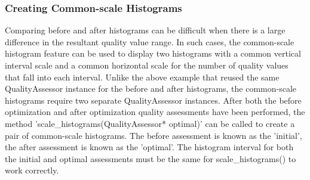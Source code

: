\subsubsection{Creating Common-scale Histograms}

Comparing before and after histograms can be difficult when there is a large difference in the resultant quality value range.  In such cases, the common-scale histogram feature can be used to display two histograms with a common vertical interval scale and a common horizontal scale for the number of quality values that fall into each interval.  Unlike the above example that reused the same QualityAssessor instance for the before and after histograms, the common-scale histograms require two separate QualityAssessor instances.  After both the before optimization and after optimization quality assessments have been performed, the method 'scale\_histograms(QualityAssessor* optimal)' can be called to create a pair of common-scale histograms.  The before assessment is known as the 'initial', the after assessment is known as the 'optimal'.   The histogram interval for both the initial and optimal assessments must be the same for scale\_histograms() to work correctly.

